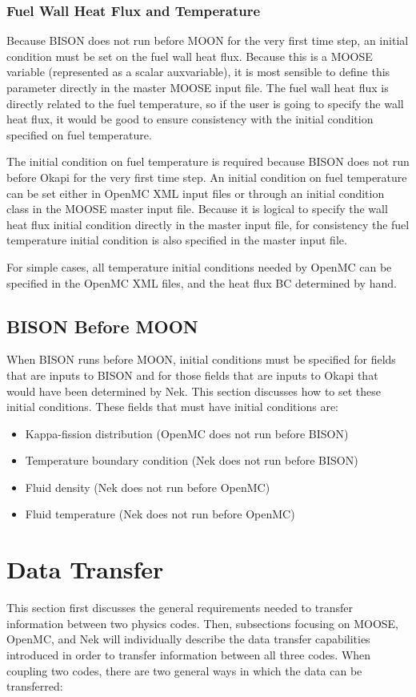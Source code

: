 \documentclass[10pt]{article}
\numberwithin{equation}{section} %
\begin{document}
\subsubsection{Fuel Wall Heat Flux and Temperature}
Because BISON does not run before MOON for the very first time step, an initial condition must be set on the fuel wall heat flux. Because this is a MOOSE variable (represented as a scalar auxvariable), it is most sensible to define this parameter directly in the master MOOSE input file. The fuel wall heat flux is directly related to the fuel temperature, so if the user is going to specify the wall heat flux, it would be good to ensure consistency with the initial condition specified on fuel temperature. 

The initial condition on fuel temperature is required because BISON does not run before Okapi for the very first time step. An initial condition on fuel temperature can be set either in OpenMC XML input files or through an initial condition class in the MOOSE master input file. Because it is logical to specify the wall heat flux initial condition directly in the master input file, for consistency the fuel temperature initial condition is also specified in the master input file. 

For simple cases, all temperature initial conditions needed by OpenMC can be specified in the OpenMC XML files, and the heat flux BC determined by hand. 

\subsection{BISON Before MOON}
When BISON runs before MOON, initial conditions must be specified for fields that are inputs to BISON and for those fields that are inputs to Okapi that would have been determined by Nek. This section discusses how to set these initial conditions. These fields that must have initial conditions are:

\begin{itemize}
\item Kappa-fission distribution (OpenMC does not run before BISON)
\item Temperature boundary condition (Nek does not run before BISON)
\item Fluid density (Nek does not run before OpenMC)
\item Fluid temperature (Nek does not run before OpenMC)
\end{itemize}

\clearpage
\section{Data Transfer}
This section first discusses the general requirements needed to transfer information between two physics codes. Then, subsections focusing on MOOSE, OpenMC, and Nek will individually describe the data transfer capabilities introduced in order to transfer information between all three codes. When coupling two codes, there are two general ways in which the data can be transferred:
\end{document}
